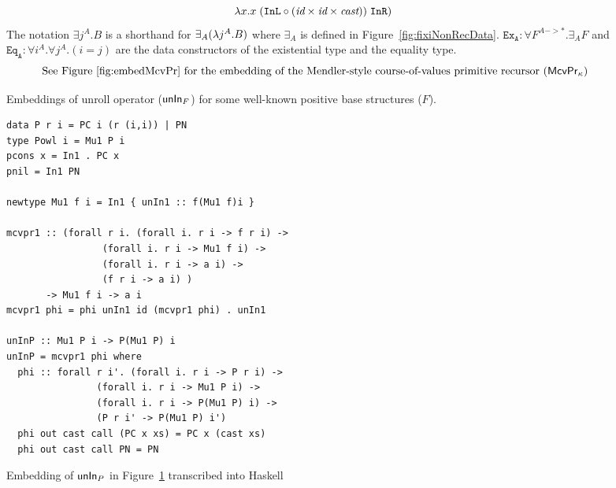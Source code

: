 {\begin{landscape}
\begin{figure}
\[\lambda x. x \;(\texttt{InL}\circ
		(\textit{id}\times\textit{id}\times\textit{cast}))
	\;\texttt{InR})
\]
The notation $\exists j^A.B$ is a shorthand for $\exists_A(\lambda j^A.B)$
where $\exists_A$ is defined in Figure~\ref{fig:fixiNonRecData}.
$\mathtt{Ex_{A}} : \forall F^{A -> *}.\exists_A F$ and
$\mathtt{Eq_{A}} : \forall i^A.\forall j^A.(i=j)$ are
the data constructors of the existential type and the equality type.
\[\text{
See Figure \ref{fig:embedMcvPr} for the embedding of the Mendler-style
course-of-values primitive recursor ($\mathsf{McvPr}_\kappa$)}
\]
\caption{Embeddings of unroll operator ($\mathsf{unIn}_F$)
	for some well-known positive base structures ($F$).}
\label{fig:unInExamples}
\end{figure}

\end{landscape}
} %

\begin{figure}
\begin{singlespace}
\begin{lstlisting}
data P r i = PC i (r (i,i)) | PN
type Powl i = Mu1 P i
pcons x = In1 . PC x
pnil = In1 PN

newtype Mu1 f i = In1 { unIn1 :: f(Mu1 f)i }

mcvpr1 :: (forall r i. (forall i. r i -> f r i) ->
                 (forall i. r i -> Mu1 f i) ->
                 (forall i. r i -> a i) ->
                 (f r i -> a i) )
       -> Mu1 f i -> a i
mcvpr1 phi = phi unIn1 id (mcvpr1 phi) . unIn1

unInP :: Mu1 P i -> P(Mu1 P) i
unInP = mcvpr1 phi where
  phi :: forall r i'. (forall i. r i -> P r i) ->
                (forall i. r i -> Mu1 P i) ->
                (forall i. r i -> P(Mu1 P) i) ->
                (P r i' -> P(Mu1 P) i')
  phi out cast call (PC x xs) = PC x (cast xs)
  phi out cast call PN = PN
\end{lstlisting}
\end{singlespace}
\caption{Embedding of $\mathsf{unIn}_P$ in Figure~\ref{fig:unInExamples}
	transcribed into Haskell}
\label{fig:HaskellunInP}
\end{figure}


